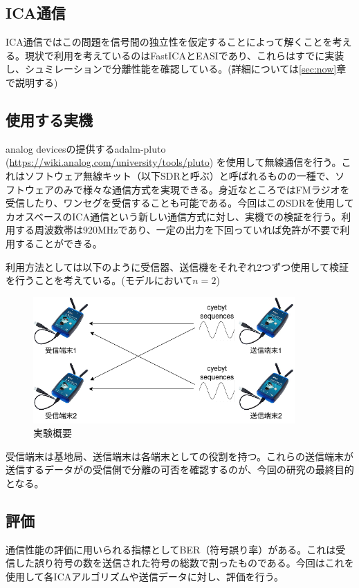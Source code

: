 \documentclass{jsarticle}
\begin{document}
\subsection{ICA通信}
ICA通信ではこの問題を信号間の独立性を仮定することによって解くことを考える。現状で利用を考えているのはFastICA\cite{fastica}とEASI\cite{easi}であり、これらはすでに実装し、シュミレーションで分離性能を確認している。(詳細については\ref{sec:now}章で説明する)

\subsection{使用する実機}
analog devicesの提供するadalm-pluto
(\url{https://wiki.analog.com/university/tools/pluto})
を使用して無線通信を行う。これはソフトウェア無線キット（以下SDRと呼ぶ）と呼ばれるものの一種で、ソフトウェアのみで様々な通信方式を実現できる。身近なところではFMラジオを受信したり、ワンセグを受信することも可能である。今回はこのSDRを使用してカオスベースのICA通信という新しい通信方式に対し、実機での検証を行う。利用する周波数帯は920MHzであり、一定の出力を下回っていれば免許が不要で利用することができる。

利用方法としては以下のように受信器、送信機をそれぞれ2つずつ使用して検証を行うことを考えている。(モデルにおいて$n=2$)

\begin{figure}[!htbp]
    \begin{center}
        \includegraphics[width=10cm]{img/3device.png}
        \caption{実験概要}
        \label{img:3device}
    \end{center}
\end{figure}

受信端末は基地局、送信端末は各端末としての役割を持つ。これらの送信端末が送信するデータがの受信側で分離の可否を確認するのが、今回の研究の最終目的となる。

\subsection{評価}
通信性能の評価に用いられる指標としてBER（符号誤り率）がある。これは受信した誤り符号の数を送信された符号の総数で割ったものである。今回はこれを使用して各ICAアルゴリズムや送信データに対し、評価を行う。
\end{document}
